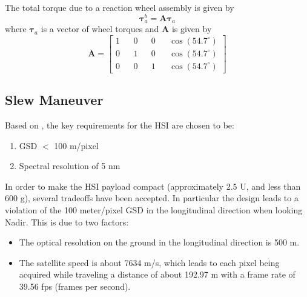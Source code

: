 The total torque due to a reaction wheel assembly is given by
\begin{equation}
    \boldsymbol{\tau}^b_{a}=\mathbf{A}\boldsymbol{\tau}_a
\end{equation}
\noindent where $\boldsymbol{\tau}_a$ is a vector of wheel torques and $\mathbf{A}$ is given by
\begin{equation}
\mathbf{A}=
    \begin{bmatrix}
        1 && 0 && 0 && \cos(54.7^{\circ}) \\
        0 && 1 && 0 && \cos(54.7^{\circ}) \\
        0 && 0 && 1 && \cos(54.7^{\circ}) 
    \end{bmatrix}
\end{equation}

\subsection{Slew Maneuver}
Based on \cite{Ack16,Dic05}, the key requirements for the HSI are chosen to be:
\begin{enumerate}
\item GSD $<$ 100 m/pixel
\item Spectral resolution of 5 nm
\end{enumerate}

In order to make the HSI payload compact (approximately 2.5 U, and
less than 600 g), several tradeoffs have been accepted. In particular
the design leads to a violation of the 100 meter/pixel GSD in the
longitudinal direction when looking Nadir. This is due to two factors:

\begin{itemize}

\item The optical resolution on the ground in the
  longitudinal direction is 500 m.

\item The satellite speed is about 7634 m/s, which leads to each pixel
  being acquired while traveling a distance of about 192.97 m with a
  frame rate of 39.56 fps (frames per second).
	
\end{itemize}

